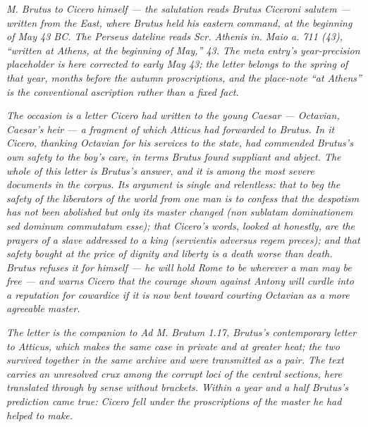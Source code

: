 
\textit{M. Brutus to Cicero himself --- the salutation reads
\textit{Brutus Ciceroni salutem} --- written from the East, where
Brutus held his eastern command, at the beginning of May 43 BC. The
Perseus dateline reads \textit{Scr. Athenis in. Maio a. 711 (43)},
``written at Athens, at the beginning of May,'' 43. The meta entry's
year-precision placeholder is here corrected to early May 43; the
letter belongs to the spring of that year, months before the autumn
proscriptions, and the place-note ``at Athens'' is the conventional
ascription rather than a fixed fact.}

\textit{The occasion is a letter Cicero had written to the young
Caesar --- Octavian, Caesar's heir --- a fragment of which Atticus
had forwarded to Brutus. In it Cicero, thanking Octavian for his
services to the state, had commended Brutus's own safety to the
boy's care, in terms Brutus found suppliant and abject. The whole
of this letter is Brutus's answer, and it is among the most severe
documents in the corpus. Its argument is single and relentless: that
to beg the safety of the liberators of the world from one man is to
confess that the despotism has not been abolished but only its master
changed (\textit{non sublatam dominationem sed dominum commutatum
esse}); that Cicero's words, looked at honestly, are the prayers of
a slave addressed to a king (\textit{servientis adversus regem
preces}); and that safety bought at the price of dignity and liberty
is a death worse than death. Brutus refuses it for himself --- he
will hold Rome to be wherever a man may be free --- and warns Cicero
that the courage shown against Antony will curdle into a reputation
for cowardice if it is now bent toward courting Octavian as a more
agreeable master.}

\textit{The letter is the companion to \textit{Ad M. Brutum} 1.17,
Brutus's contemporary letter to Atticus, which makes the same case
in private and at greater heat; the two survived together in the
same archive and were transmitted as a pair. The text carries an
unresolved crux among the corrupt loci of the central sections, here
translated through by sense without brackets. Within a year and a
half Brutus's prediction came true: Cicero fell under the
proscriptions of the master he had helped to make.}
